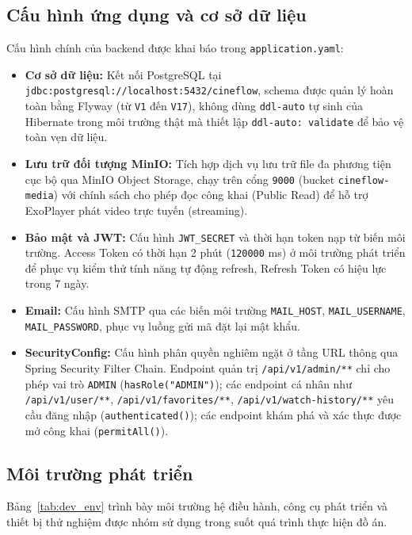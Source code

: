 \subsection{Cấu hình ứng dụng và cơ sở dữ liệu}
\label{subsec:cau_hinh_ung_dung}

Cấu hình chính của backend được khai báo trong \texttt{application.yaml}:

\begin{itemize}
    \item \textbf{Cơ sở dữ liệu:} Kết nối PostgreSQL tại \texttt{jdbc:postgresql://localhost:5432/cineflow}, schema được quản lý hoàn toàn bằng Flyway (từ \texttt{V1} đến \texttt{V17}), không dùng \texttt{ddl-auto} tự sinh của Hibernate trong môi trường thật mà thiết lập \texttt{ddl-auto: validate} để bảo vệ toàn vẹn dữ liệu.
    \item \textbf{Lưu trữ đối tượng MinIO:} Tích hợp dịch vụ lưu trữ file đa phương tiện cục bộ qua MinIO Object Storage, chạy trên cổng \texttt{9000} (bucket \texttt{cineflow-media}) với chính sách cho phép đọc công khai (Public Read) để hỗ trợ ExoPlayer phát video trực tuyến (streaming).
    \item \textbf{Bảo mật và JWT:} Cấu hình \texttt{JWT\_SECRET} và thời hạn token nạp từ biến môi trường. Access Token có thời hạn 2 phút (\texttt{120000} ms) ở môi trường phát triển để phục vụ kiểm thử tính năng tự động refresh, Refresh Token có hiệu lực trong 7 ngày.
    \item \textbf{Email:} Cấu hình SMTP qua các biến môi trường \texttt{MAIL\_HOST}, \texttt{MAIL\_USERNAME}, \texttt{MAIL\_PASSWORD}, phục vụ luồng gửi mã đặt lại mật khẩu.
    \item \textbf{SecurityConfig:} Cấu hình phân quyền nghiêm ngặt ở tầng URL thông qua Spring Security Filter Chain. Endpoint quản trị \texttt{/api/v1/admin/**} chỉ cho phép vai trò \texttt{ADMIN} (\texttt{hasRole("ADMIN")}); các endpoint cá nhân như \texttt{/api/v1/user/**}, \texttt{/api/v1/favorites/**}, \texttt{/api/v1/watch-history/**} yêu cầu đăng nhập (\texttt{authenticated()}); các endpoint khám phá và xác thực được mở công khai (\texttt{permitAll()}).
\end{itemize}

\subsection{Môi trường phát triển}
\label{subsec:moi_truong_phat_trien}

Bảng~\ref{tab:dev_env} trình bày môi trường hệ điều hành, công cụ phát triển và thiết bị thử nghiệm được nhóm sử dụng trong suốt quá trình thực hiện đồ án.

